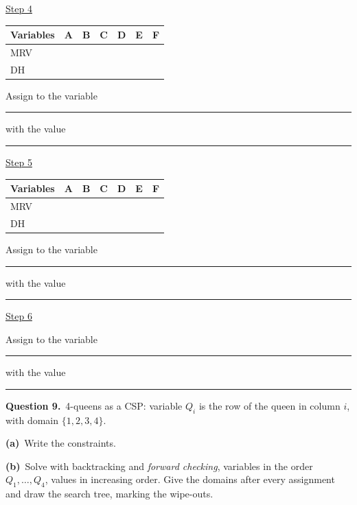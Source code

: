 \documentclass[11pt,a4paper]{article}
\newcommand{\question}[1]{\par\medskip\noindent\textbf{Question #1.}\ }
\newcommand{\subq}[1]{\par\smallskip\noindent\textbf{#1}\ }
\begin{document}
\underline{Step 4}\par\begin{center}\small \begin{tabular}{|l|c|c|c|c|c|c|}\hline Variables & \textbf{A} & \textbf{B} & \textbf{C} & \textbf{D} & \textbf{E} & \textbf{F}\\ \hline MRV & \phantom{0} & \phantom{0} & \phantom{0} & \phantom{0} & \phantom{0} & \phantom{0}\\[1mm]\hline DH & \phantom{0} & \phantom{0} & \phantom{0} & \phantom{0} & \phantom{0} & \phantom{0}\\[1mm]\hline\end{tabular}\end{center}Assign to the variable \rule{2.5cm}{0.3pt} with the value \rule{2.5cm}{0.3pt}\par
\underline{Step 5}\par\begin{center}\small \begin{tabular}{|l|c|c|c|c|c|c|}\hline Variables & \textbf{A} & \textbf{B} & \textbf{C} & \textbf{D} & \textbf{E} & \textbf{F}\\ \hline MRV & \phantom{0} & \phantom{0} & \phantom{0} & \phantom{0} & \phantom{0} & \phantom{0}\\[1mm]\hline DH & \phantom{0} & \phantom{0} & \phantom{0} & \phantom{0} & \phantom{0} & \phantom{0}\\[1mm]\hline\end{tabular}\end{center}Assign to the variable \rule{2.5cm}{0.3pt} with the value \rule{2.5cm}{0.3pt}\par
\underline{Step 6}\par Assign to the variable \rule{2.5cm}{0.3pt} with the value \rule{2.5cm}{0.3pt}\par
\clearpage
\question{9}4-queens as a CSP: variable $Q_i$ is the row of the queen in column $i$, with domain $\{1,2,3,4\}$.
\subq{(a)}Write the constraints.
\begin{ansbox}[height=1.0cm]\end{ansbox}
\subq{(b)}Solve with backtracking and \emph{forward checking}, variables in the order $Q_1,\dots,Q_4$, values in increasing order. Give the domains after every assignment and draw the search tree, marking the wipe-outs.
\begin{ansbox}[height=7.5cm]\end{ansbox}
\end{document}
